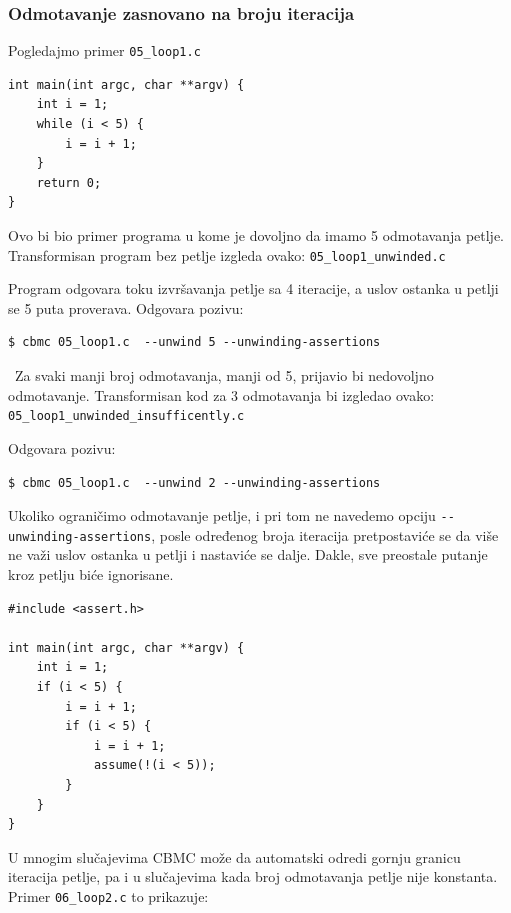 \subsubsection{Odmotavanje zasnovano na broju iteracija}\label{odmotavanje-zasnovano-na-broju-iteracija}

Pogledajmo primer \texttt{05\_loop1.c}

\begin{verbatim}
int main(int argc, char **argv) {
    int i = 1;
    while (i < 5) {
        i = i + 1;
    }
    return 0;
}
\end{verbatim}

Ovo bi bio primer programa u kome je dovoljno da imamo 5 odmotavanja petlje. Transformisan program bez petlje izgleda ovako: \texttt{05\_loop1\_unwinded.c}


Program odgovara toku izvršavanja petlje sa 4 iteracije, a uslov ostanka u petlji se 5 puta proverava. Odgovara pozivu:

\begin{verbatim}
$ cbmc 05_loop1.c  --unwind 5 --unwinding-assertions
\end{verbatim}

~Za svaki manji broj odmotavanja, manji od 5, prijavio bi nedovoljno odmotavanje. Transformisan kod za 3 odmotavanja bi izgledao ovako: \texttt{05\_loop1\_unwinded\_insufficently.c}


Odgovara pozivu:

\begin{verbatim}
$ cbmc 05_loop1.c  --unwind 2 --unwinding-assertions
\end{verbatim}

Ukoliko ograničimo odmotavanje petlje, i pri tom ne navedemo opciju \texttt{-{}-unwinding-assertions}, posle određenog broja iteracija pretpostaviće se da više ne važi uslov ostanka u petlji i nastaviće se dalje. Dakle, sve preostale putanje kroz petlju biće ignorisane.

\begin{verbatim}
#include <assert.h>

int main(int argc, char **argv) {
    int i = 1;
    if (i < 5) {
        i = i + 1;
        if (i < 5) {
            i = i + 1;
            assume(!(i < 5));
        }
    }
}
\end{verbatim}

U mnogim slučajevima CBMC može da automatski odredi gornju granicu iteracija petlje, pa i u slučajevima kada broj odmotavanja petlje nije konstanta. Primer \texttt{06\_loop2.c} to prikazuje:

